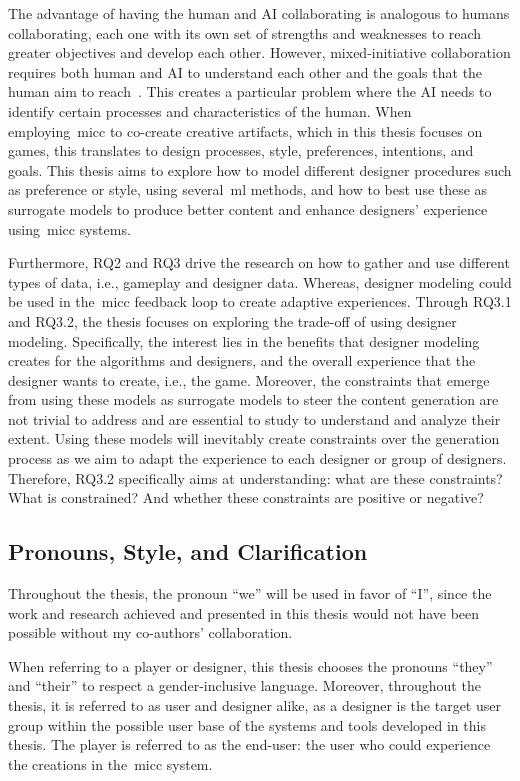 The advantage of having the human and AI collaborating is analogous to humans collaborating, each one with its own set of strengths and weaknesses to reach greater objectives and develop each other. However, mixed-initiative collaboration requires both human and AI to understand each other and the goals that the human aim to reach~\cite{Horvitz99-mixedInit,novick97-mixedInit}. This creates a particular problem where the AI needs to identify certain processes and characteristics of the human. When employing~\acrshort{micc} to co-create creative artifacts, which in this thesis focuses on games, this translates to design processes, style, preferences, intentions, and goals. This thesis aims to explore how to model different designer procedures such as preference or style, using several~\acrlong{ml} methods, and how to best use these as surrogate models to produce better content and enhance designers' experience using~\acrshort{micc} systems.

Furthermore, RQ2 and RQ3 drive the research on how to gather and use different types of data, i.e., gameplay and designer data. Whereas, designer modeling could be used in the~\acrshort{micc} feedback loop to create adaptive experiences. Through RQ3.1 and RQ3.2, the thesis focuses on exploring the trade-off of using designer modeling. Specifically, the interest lies in the benefits that designer modeling creates for the algorithms and designers, and the overall experience that the designer wants to create, i.e., the game. Moreover, the constraints that emerge from using these models as surrogate models to steer the content generation are not trivial to address and are essential to study to understand and analyze their extent. Using these models will inevitably create constraints over the generation process as we aim to adapt the experience to each designer or group of designers. Therefore, RQ3.2 specifically aims at understanding: what are these constraints? What is constrained? And whether these constraints are positive or negative? 

\subsection{Pronouns, Style, and Clarification}

Throughout the thesis, the pronoun ``we'' will be used in favor of ``I'', since the work and research achieved and presented in this thesis would not have been possible without my co-authors' collaboration. 

When referring to a player or designer, this thesis chooses the pronouns ``they'' and ``their'' to respect a gender-inclusive language. Moreover, throughout the thesis, it is referred to as user and designer alike, as a designer is the target user group within the possible user base of the systems and tools developed in this thesis. The player is referred to as the end-user: the user who could experience the creations in the~\acrlong{micc} system.

